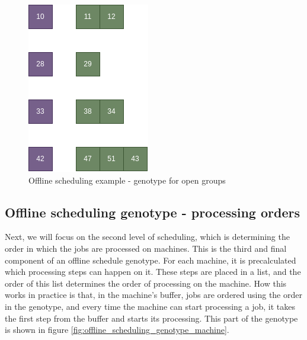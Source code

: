 \begin{figure}[!htbp]
	\centering
	\includegraphics[scale=0.6]{../images/offline_scheduling_genotype_open.png}
	\caption{Offline scheduling example - genotype for open groups}
    \label{fig:offline_scheduling_genotype_open}
\end{figure}

\subsection{Offline scheduling genotype - processing orders}

Next, we will focus on the second level of scheduling, which is determining the order in which the jobs are processed on machines. This is the third and final component of an offline schedule genotype. For each machine, it is precalculated which processing steps can happen on it. These steps are placed in a list, and the order of this list determines the order of processing on the machine. How this works in practice is that, in the machine's buffer, jobs are ordered using the order in the genotype, and every time the machine can start processing a job, it takes the first step from the buffer and starts its processing. This part of the genotype is shown in figure \ref{fig:offline_scheduling_genotype_machine}.

